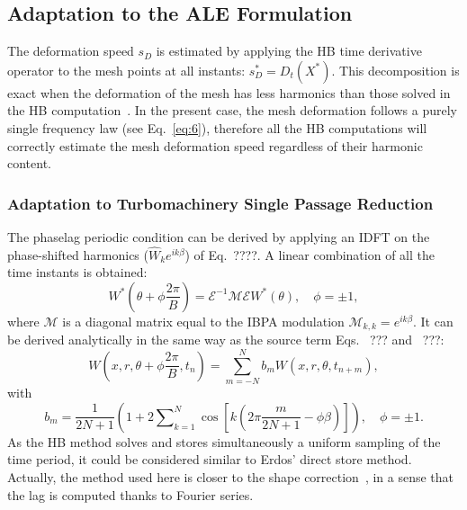 \subsection{Adaptation to the ALE Formulation}
\label{sec:adapt-ale-form}

The deformation speed $s_D$ is estimated by applying the HB time
derivative operator to the mesh points at all instants:
$s_D^*=D_t(X^*)$. This decomposition is exact when the
  deformation of the mesh has less harmonics than those solved in the
  HB computation~\cite{Dufour2010}. In the present case, the mesh
  deformation follows a purely single frequency law (see
  Eq.~\eqref{eq:6}), therefore all the HB computations will correctly
  estimate the mesh deformation speed regardless of their harmonic content.


\subsubsection{Adaptation to Turbomachinery Single Passage
    Reduction}
\label{sec:Adptatreduction}

The phaselag periodic condition can be derived by applying an
  IDFT on the phase-shifted harmonics ($\widehat{W}_ke^{ik\beta}$) of
  Eq.~????. A linear
combination of all the time instants is obtained:
\begin{equation}
  W^*\left(\theta+\phi\frac{2\pi}{B}\right)=\mathcal{E}^{-1}\mathcal{M}\mathcal{E}W^*(\theta),\quad \phi=\pm 1,
\end{equation}
where $\mathcal{M}$ is a diagonal matrix equal to the IBPA modulation
$\mathcal{M}_{k,k}=e^{i k\beta}$. It can be derived
analytically in the same way as the source term Eqs.~ ???
and~ ???:
\begin{equation}
  W\left(x, r, \theta+\phi\frac{2\pi}{B}, t_n\right) =\sum_{m=-N}^N
  b_mW(x, r, \theta, t_{n+m}), 
\end{equation}
with
\begin{equation}
  b_m=\frac{1}{2N+1}\left(1+2\sum\nolimits_{k=1}^N\cos\left[k\left(2\pi
        \frac{m}{2N+1}-\phi \beta\right)\right]\right),\quad \phi=\pm 1.
\end{equation}
As the HB method solves and stores simultaneously a uniform sampling
of the time period, it could be considered similar to Erdos' direct
store method. Actually, the method used here is closer to the shape
correction~\cite{He1990}, in a sense that the lag is
computed thanks to Fourier series.%

